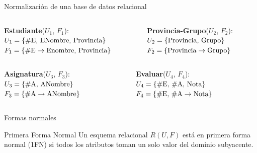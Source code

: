 \begin{frame}{Normalizaci\'on de una base de datos relacional}
    \begin{columns}[T]
        \begin{column}{0.48\linewidth}
            \textbf{Estudiante}($U_1$, $F_1$):\\
            $U_1 = \{\textnormal{\#E, ENombre, Provincia}\}$\\
            $F_1 = \{\textnormal{\#E} \to \textnormal{Enombre, Provincia}\}$

        \end{column}

        \begin{column}{0.48\linewidth}
            \textbf{Provincia-Grupo}($U_2$, $F_2$):\\
            $U_2 = \{\textnormal{Provincia, Grupo}\}$\\
            $F_2 = \{\textnormal{Provincia} \to \textnormal{Grupo}\}$
        \end{column}
        
    \end{columns}

    \vspace{10mm}

    \begin{columns}[T]
        \begin{column}{0.48\linewidth}
            \textbf{Asignatura}($U_3$, $F_3$):\\
            $U_3 = \{\textnormal{\#A, ANombre}\}$\\
            $F_3 = \{\textnormal{\#A} \to \textnormal{ANombre}\}$
        \end{column}

        \begin{column}{0.48\linewidth}
            \textbf{Evaluar}($U_4$, $F_4$):\\
            $U_4 = \{\textnormal{\#E, \#A, Nota}\}$\\
            $F_4 = \{\textnormal{\#E, \#A} \to \textnormal{Nota}\}$
        \end{column}
        
    \end{columns}
\end{frame}






\begin{frame}{Formas normales}
    \begin{block}{Primera Forma Normal}
        Un esquema relacional $R(U,F)$ est\'a en primera forma
        normal (1FN) si todos los atributos toman un solo valor del dominio
        subyacente.
        
    \end{block}
\end{frame}

